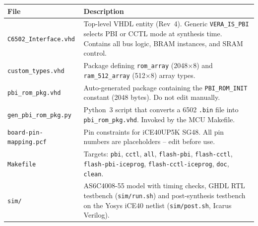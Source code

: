 \documentclass[11pt,a4paper]{article}
\newcommand{\cmd}[1]{\texttt{#1}}
\newcommand{\file}[1]{\texttt{#1}}
\begin{document}
\begin{center}
\begin{tabular}{lp{9cm}}
\toprule
\textbf{File} & \textbf{Description} \\
\midrule
\file{C6502\_Interface.vhd} &
    Top-level VHDL entity (Rev~4).  Generic \cmd{VERA\_IS\_PBI}
    selects PBI or CCTL mode at synthesis time.  Contains all bus
    logic, BRAM instances, and SRAM control. \\
\file{custom\_types.vhd} &
    Package defining \cmd{rom\_array} (2048$\times$8) and
    \cmd{ram\_512\_array} (512$\times$8) array types. \\
\file{pbi\_rom\_pkg.vhd} &
    Auto-generated package containing the \cmd{PBI\_ROM\_INIT}
    constant (2048 bytes).  Do not edit manually. \\
\file{gen\_pbi\_rom\_pkg.py} &
    Python~3 script that converts a 6502 \file{.bin} file into
    \file{pbi\_rom\_pkg.vhd}.  Invoked by the MCU Makefile. \\
\file{board-pin-mapping.pcf} &
    Pin constraints for iCE40UP5K SG48.
    All pin numbers are placeholders -- edit before use. \\
\file{Makefile} &
    Targets: \cmd{pbi}, \cmd{cctl}, \cmd{all}, \cmd{flash-pbi},
    \cmd{flash-cctl}, \cmd{flash-pbi-iceprog}, \cmd{flash-cctl-iceprog},
    \cmd{doc}, \cmd{clean}. \\
\file{sim/} &
    AS6C4008-55 model with timing checks, GHDL RTL testbench
    (\cmd{sim/run.sh}) and post-synthesis testbench on the Yosys
    iCE40 netlist (\cmd{sim/post.sh}, Icarus Verilog). \\
\bottomrule
\end{tabular}
\end{center}
\end{document}
